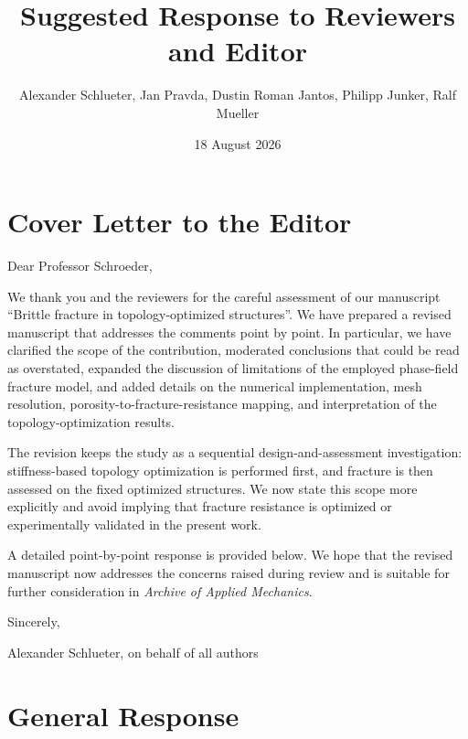 \documentclass[11pt,a4paper]{article}
\title{Suggested Response to Reviewers and Editor}
\author{Alexander Schlueter, Jan Pravda, Dustin Roman Jantos, Philipp Junker, Ralf Mueller}
\date{18 August 2026}
\begin{document}
\maketitle

\section*{Cover Letter to the Editor}

Dear Professor Schroeder,

We thank you and the reviewers for the careful assessment of our manuscript
``Brittle fracture in topology-optimized structures''. We have prepared a revised
manuscript that addresses the comments point by point. In particular, we have
clarified the scope of the contribution, moderated conclusions that could be
read as overstated, expanded the discussion of limitations of the employed
phase-field fracture model, and added details on the numerical implementation,
mesh resolution, porosity-to-fracture-resistance mapping, and interpretation of
the topology-optimization results.

The revision keeps the study as a sequential design-and-assessment
investigation: stiffness-based topology optimization is performed first, and
fracture is then assessed on the fixed optimized structures. We now state this
scope more explicitly and avoid implying that fracture resistance is optimized
or experimentally validated in the present work.

A detailed point-by-point response is provided below. We hope that the revised
manuscript now addresses the concerns raised during review and is suitable for
further consideration in \emph{Archive of Applied Mechanics}.

Sincerely,

Alexander Schlueter, on behalf of all authors

\section*{General Response}
\end{document}
